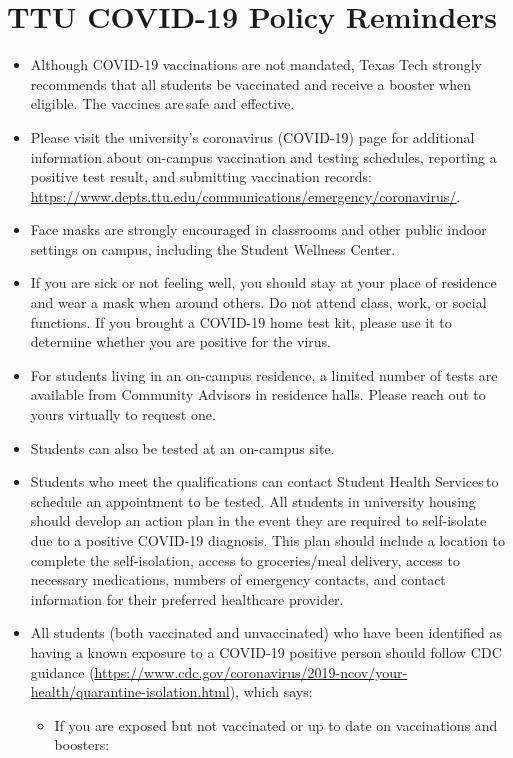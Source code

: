 \documentclass[12pt, notitlepage]{article}   	%
\begin{document}
{\section{TTU COVID-19 Policy Reminders}
\begin{itemize}
	\item{Although COVID-19 vaccinations are not mandated, Texas Tech strongly 
	recommends that all students be vaccinated and receive a booster when eligible.
	The vaccines are safe and effective.}
	\item{Please visit the university’s coronavirus (COVID-19) page for additional 
	information about on-campus vaccination and testing schedules, reporting a 
	positive test result, and submitting vaccination records: 
	\url{https://www.depts.ttu.edu/communications/emergency/coronavirus/}.}
	\item{Face masks are strongly encouraged in classrooms and other public indoor 
	settings on campus, including the Student Wellness Center.}
	\item{If you are sick or not feeling well, you should stay at your place of 
	residence and wear a mask when around others.  Do not attend class, work, or social functions. 
	If you brought a COVID-19 home test kit, please use it to determine whether you are 
	positive for the virus.}
	\item{For students living in an on-campus residence, a limited number of tests 
	are available from Community Advisors in residence halls. Please reach out to 
	yours virtually to request one. }
	\item{Students can also be tested at an on-campus site.}
	\item{Students who meet the qualifications can contact Student Health Services to 
	schedule an appointment to be tested. 
	All students in university housing should develop an action plan in the event 
	they are required to self-isolate due to a positive COVID-19 diagnosis. 
	This plan should include a location to complete the self-isolation, access to 
	groceries/meal delivery, access to necessary medications, numbers of emergency 
	contacts, and contact information for their preferred healthcare provider.}
	\item{All students (both vaccinated and unvaccinated) who have been identified as 
	having a known exposure to a COVID-19 positive person should follow CDC guidance 
	(\url{https://www.cdc.gov/coronavirus/2019-ncov/your-health/quarantine-isolation.html}), 
	which says:
		\begin{itemize}
			\item{If you are exposed but not vaccinated or up to date on vaccinations and boosters:
}
\end{itemize}}
\end{itemize}}
\end{document}
